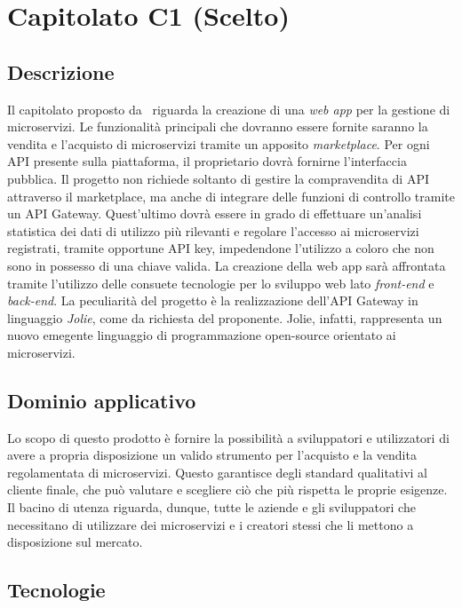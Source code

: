 \newpage
\section{Capitolato C1 (Scelto)}

\subsection{Descrizione}

Il capitolato proposto da \proponente\ riguarda la creazione di una \textit{web app} per la gestione di microservizi. Le funzionalità principali che dovranno essere fornite saranno la vendita e l'acquisto di microservizi tramite un apposito \textit{marketplace}. Per ogni API presente sulla piattaforma, il proprietario dovrà fornirne l'interfaccia pubblica. Il progetto non richiede soltanto di gestire la compravendita di API attraverso il marketplace, ma anche di integrare delle funzioni di controllo tramite un API Gateway. Quest'ultimo dovrà essere in grado di effettuare un'analisi statistica dei dati di utilizzo più rilevanti e regolare l'accesso ai microservizi registrati, tramite opportune API key, impedendone l'utilizzo a coloro che non sono in possesso di una chiave valida. La creazione della web app sarà affrontata tramite l'utilizzo delle consuete tecnologie per lo sviluppo web lato \textit{front-end} e \textit{back-end}. La peculiarità del progetto è la realizzazione dell'API Gateway in linguaggio \textit{Jolie}, come da richiesta del proponente. Jolie, infatti, rappresenta un nuovo emegente linguaggio di programmazione open-source orientato ai microservizi.

\subsection{Dominio applicativo}

Lo scopo di questo prodotto è fornire la possibilità a sviluppatori e utilizzatori di avere a propria disposizione un valido strumento per l'acquisto e la vendita regolamentata di microservizi. Questo garantisce degli standard qualitativi al cliente finale, che può valutare e scegliere ciò che più rispetta le proprie esigenze. Il bacino di utenza riguarda, dunque, tutte le aziende e gli sviluppatori che necessitano di utilizzare dei microservizi e i creatori stessi che li mettono a disposizione sul mercato.

\subsection{Tecnologie}

